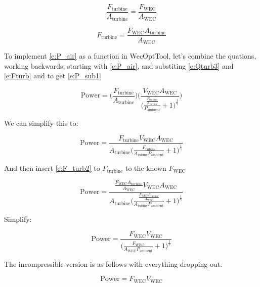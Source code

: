 \documentclass[conf]{new-aiaa}
\begin{document}
\begin{equation}
\label{e:F_turb1}
\frac{F_\text{turbine}}{A_\text{turbine}} = \frac{F_\text{WEC}}{A_\text{WEC}}
\end{equation}

\begin{equation}
\label{e:F_turb2}
F_\text{turbine} = \frac{F_\text{WEC} A_\text{turbine}}{A_\text{WEC}}
\end{equation}

To implement \cref{e:P_air} as a function in WecOptTool, let's combine the quations, working backwards, starting with \cref{e:P_air}, and substiting \cref{e:Qturb3} and \cref{e:Fturb} and to get \cref{e:P_sub1}

\begin{equation}
\label{e:P_sub1}
\text{Power} = \bigg( \frac{F_\text{turbine}}{A_\text{turbine}}\bigg) \Bigg(  \frac{V_\text{WEC} A_\text{WEC}} {\bigg(\frac{\frac{F_\text{turbine}}{A_\text{turbine}}}{P_\text{ambient} } + 1\bigg)^\frac{1}{\gamma}} \Bigg)
\end{equation}

We can simplify this to:

\begin{equation}
\label{e:P_sub5}
\text{Power} = \frac{F_\text{turbine} V_\text{WEC} A_\text{WEC} }{A_\text{turbine} \bigg(\frac{F_\text{tubine}} {A_\text{tubine} P_\text{ambient}} + 1 \bigg)^\frac{1}{\gamma}}
\end{equation}

And then insert \cref{e:F_turb2} to $F_\text{turbine}$ to the known $F_\text{WEC}$

\begin{equation}
\label{e:P_sub52}
\text{Power} = \frac{\frac{F_\text{WEC} A_\text{turbine}}{A_\text{WEC}} V_\text{WEC} A_\text{WEC} }{A_\text{turbine} \bigg(\frac{\frac{F_\text{WEC} A_\text{turbine}}{A_\text{WEC}}} {A_\text{tubine} P_\text{ambient}} + 1 \bigg)^\frac{1}{\gamma}}
\end{equation}

Simplify:

\begin{equation}
\label{e:P_sub7}
\text{Power} = \frac{F_\text{WEC}  V_\text{WEC} }{\bigg(\frac{F_\text{WEC}} {A_\text{WEC} P_\text{ambient}} + 1 \bigg)^\frac{1}{\gamma}}
\end{equation}

The incompressible version is as follows with everything dropping out.

\begin{equation}
\label{e:P_sub8}
\text{Power} =  F_\text{WEC} V_\text{WEC}
\end{equation}
\end{document}

